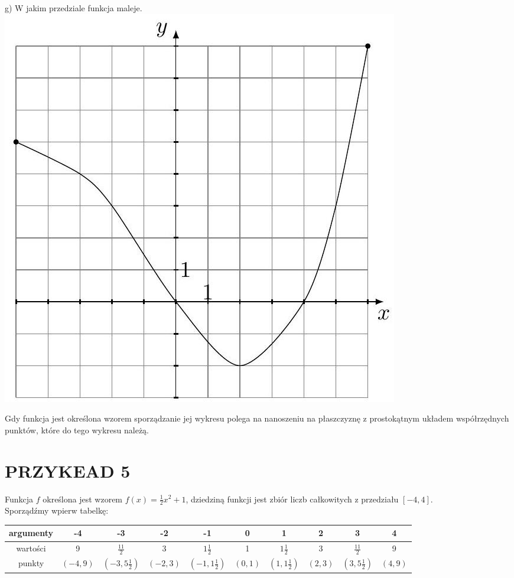 \documentclass[10pt]{article}
\begin{document}
\begin{enumerate}
g) W jakim przedziale funkcja maleje.\\
\includegraphics[max width=\textwidth, center]{2024_11_21_e9b4faa005d5be2cc318g-129(1)}
\end{enumerate}

Gdy funkcja jest określona wzorem sporządzanie jej wykresu polega na nanoszeniu na płaszczyznę z prostokątnym układem współrzędnych punktów, które do tego wykresu należą.

\section*{PRZYKEAD 5}
Funkcja \(f\) określona jest wzorem \(f(x)=\frac{1}{2} x^{2}+1\), dziedziną funkcji jest zbiór liczb całkowitych z przedziału \([-4,4]\).\\
Sporządźmy wpierw tabelkę:

\begin{center}
\begin{tabular}{|c|c|c|c|c|c|c|c|c|c|}
\hline
argumenty & -4 & -3 & -2 & -1 & 0 & 1 & 2 & 3 & 4 \\
\hline
wartości & 9 & \(\frac{11}{2}\) & 3 & \(1 \frac{1}{2}\) & 1 & \(1 \frac{1}{2}\) & 3 & \(\frac{11}{2}\) & 9 \\
\hline
punkty & \((-4,9)\) & \(\left(-3,5 \frac{1}{2}\right)\) & \((-2,3)\) & \(\left(-1,1 \frac{1}{2}\right)\) & \((0,1)\) & \(\left(1,1 \frac{1}{2}\right)\) & \((2,3)\) & \(\left(3,5 \frac{1}{2}\right)\) & \((4,9)\) \\
\hline
\end{tabular}
\end{center}
\end{document}
